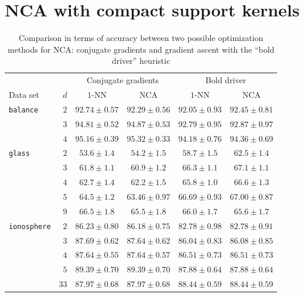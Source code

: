 \section{NCA with compact support kernels}
\label{app:sec:nca-cs}

\begin{landscape}

  \begin{table}
    \centering\begin{tabular}{lrcccc}
      \toprule
      &     & \multicolumn{2}{c}{Conjugate gradients}  & \multicolumn{2}{c}{Bold driver}\\
      \cmidrule(r){3-4} \cmidrule(r){5-6}
      Data set & $d$ & $1$-NN & NCA & $1$-NN & NCA \\
      \midrule
	\texttt{balance}&$2$&$92.74 \pm 0.57$&$92.29 \pm 0.56$&$92.05 \pm 0.93$&$92.45 \pm 0.81$\\ 
	&$3$&$94.81 \pm 0.52$&$94.87 \pm 0.53$&$92.79 \pm 0.95$&$92.87 \pm 0.97$\\ 
	&$4$&$95.16 \pm 0.39$&$95.32 \pm 0.33$&$94.18 \pm 0.76$&$94.36 \pm 0.69$\\ 
	\midrule
	\texttt{glass}&$2$&$53.6 \pm 1.4$&$54.2 \pm 1.5$&$58.7 \pm 1.5$&$62.5 \pm 1.4$\\ 
	&$3$&$61.8 \pm 1.1$&$60.9 \pm 1.2$&$66.3 \pm 1.1$&$67.1 \pm 1.1$\\ 
	&$4$&$62.7 \pm 1.4$&$62.2 \pm 1.5$&$65.8 \pm 1.0$&$66.6 \pm 1.3$\\ 
	&$5$&$64.5 \pm 1.2$&$63.46 \pm 0.97$&$66.69 \pm 0.93$&$67.00 \pm 0.87$\\ 
	&$9$&$66.5 \pm 1.8$&$65.5 \pm 1.8$&$66.0 \pm 1.7$&$65.6 \pm 1.7$\\ 
	\midrule
	\texttt{ionosphere}&$2$&$86.23 \pm 0.80$&$86.18 \pm 0.75$&$82.78 \pm 0.98$&$82.78 \pm 0.91$\\ 
	&$3$&$87.69 \pm 0.62$&$87.64 \pm 0.62$&$86.04 \pm 0.83$&$86.08 \pm 0.85$\\ 
	&$4$&$87.64 \pm 0.55$&$87.64 \pm 0.57$&$86.51 \pm 0.73$&$86.51 \pm 0.73$\\ 
	&$5$&$89.39 \pm 0.70$&$89.39 \pm 0.70$&$87.88 \pm 0.64$&$87.88 \pm 0.64$\\ 
	&$33$&$87.97 \pm 0.68$&$87.97 \pm 0.68$&$88.44 \pm 0.59$&$88.44 \pm 0.59$\\ 
      \bottomrule
    \end{tabular}
  \caption{Comparison in terms of accuracy between two possible optimization methods for NCA: conjugate gradients and gradient ascent with the ``bold driver'' heuristic}
  \label{table:comp-opts-1}
  \end{table}


\end{landscape}
